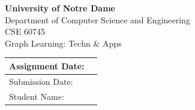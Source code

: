 \documentclass[11pt]{article}
\begin{document}
\thispagestyle{fancy}
\vspace*{2.2cm}
\begin{center}
  {\Huge\bfseries\sffamily University of Notre Dame}\\[0.9em]
  {\LARGE Department of Computer Science and Engineering}\\[3.2em]
  {\LARGE CSE 60745}\\[0.7em]
  {\LARGE Graph Learning: Techn \& Apps}\\[3.2em]

  \begin{tabular}{|p{5cm}|p{7cm}|}
    \hline
    \rule{0pt}{3.2em}\hfill Assignment Date: & \\[1.1em]
    \hline
    \rule{0pt}{3.2em}\hfill Submission Date: & \\[1.1em]
    \hline
    \rule{0pt}{3.2em}\hfill Student Name: & \\[1.1em]
    \hline
  \end{tabular}
\end{center}

\newpage


\label{p0:lastpage}
\end{document}
